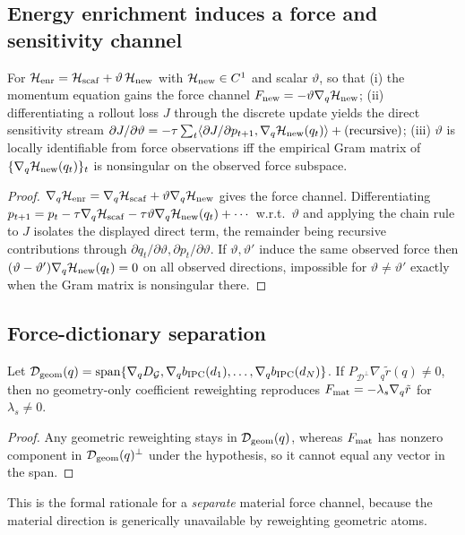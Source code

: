 \subsection{Energy enrichment induces a force and sensitivity channel}
\begin{lemma}\label{lem:enrichment_channels}
For $\mathcal{H}_{\rm enr}=\mathcal{H}_{\rm scaf}+\vartheta\,\mathcal{H}_{\rm new}$ with
$\mathcal{H}_{\rm new}\in C^1$ and scalar $\vartheta$, so that (i) the momentum equation gains
the force channel $F_{\rm new}=-\vartheta\nabla_q\mathcal{H}_{\rm new}$; (ii)
differentiating a rollout loss $J$ through the discrete update yields the direct
sensitivity stream $\partial J/\partial\vartheta=-\tau\sum_t\langle\partial
J/\partial p_{t+1},\nabla_q\mathcal{H}_{\rm new}(q_t)\rangle+(\text{recursive})$; (iii)
$\vartheta$ is locally identifiable from force observations iff the empirical
Gram matrix of $\{\nabla_q\mathcal{H}_{\rm new}(q_t)\}_t$ is nonsingular on the observed
force subspace.
\end{lemma}
\begin{proof}
$\nabla_q\mathcal{H}_{\rm enr}=\nabla_q\mathcal{H}_{\rm scaf}+\vartheta\nabla_q\mathcal{H}_{\rm new}$
gives the force channel. Differentiating
$p_{t+1}=p_t-\tau\nabla_q\mathcal{H}_{\rm scaf}-\tau\vartheta\nabla_q\mathcal{H}_{\rm new}(q_t)+\cdots$
w.r.t.\ $\vartheta$ and applying the chain rule to $J$ isolates the displayed
direct term, the remainder being recursive contributions through
$\partial q_t/\partial\vartheta,\partial p_t/\partial\vartheta$. If
$\vartheta,\vartheta'$ induce the same observed force then
$(\vartheta-\vartheta')\nabla_q\mathcal{H}_{\rm new}(q_t)=0$ on all observed directions,
impossible for $\vartheta\ne\vartheta'$ exactly when the Gram matrix is
nonsingular there.
\end{proof}

\subsection{Force-dictionary separation}
\begin{lemma}\label{lem:force_sep}
Let $\mathcal D_{\rm geom}(q)=\operatorname{span}\{\nabla_q D_{\mathcal G},
\nabla_q b_{\rm IPC}(d_1),\dots,\nabla_q b_{\rm IPC}(d_N)\}$. If
$P_{\mathcal D^\perp}\nabla_q\tilde r(q)\ne0$, then no geometry-only coefficient
reweighting reproduces $F_{\rm mat}=-\lambda_s\nabla_q\tilde r$ for
$\lambda_s\ne0$.
\end{lemma}
\begin{proof}
Any geometric reweighting stays in $\mathcal D_{\rm geom}(q)$, whereas
$F_{\rm mat}$ has nonzero component in $\mathcal D_{\rm geom}(q)^\perp$ under the
hypothesis, so it cannot equal any vector in the span.
\end{proof}
This is the formal rationale for a \emph{separate} material force channel, because the
material direction is generically unavailable by reweighting geometric atoms.

